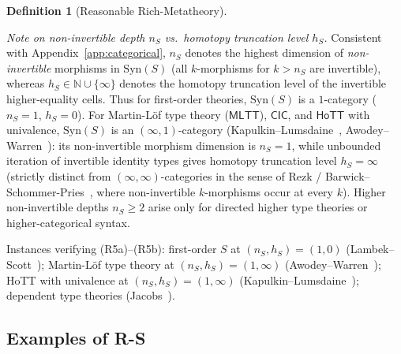 \documentclass[11pt]{article}
\theoremstyle{plain}
\theoremstyle{definition}
\newtheorem{definition}[theorem]{Definition}
\newcommand{\Syn}{\mathrm{Syn}}
\newcommand{\MLTT}{\mathsf{MLTT}}
\newcommand{\HoTT}{\mathsf{HoTT}}
\newcommand{\CIC}{\mathsf{CIC}}
\begin{document}
\begin{definition}[Reasonable Rich-Metatheory]
\begin{itemize}
\emph{Note on non-invertible depth $n_S$ vs.\ homotopy truncation level $h_S$.} Consistent with Appendix~\ref{app:categorical}, $n_S$ denotes the highest dimension of \emph{non-invertible} morphisms in $\Syn(S)$ (all $k$-morphisms for $k > n_S$ are invertible), whereas $h_S \in \mathbb{N} \cup \{\infty\}$ denotes the homotopy truncation level of the invertible higher-equality cells. Thus for first-order theories, $\Syn(S)$ is a $1$-category ($n_S = 1$, $h_S = 0$). For Martin-L\"of type theory ($\MLTT$), $\CIC$, and $\HoTT$ with univalence, $\Syn(S)$ is an $(\infty, 1)$-category (Kapulkin--Lumsdaine~\cite{KapulkinLumsdaine2021}, Awodey--Warren~\cite{AwodeyWarren2009}): its non-invertible morphism dimension is $n_S = 1$, while unbounded iteration of invertible identity types gives homotopy truncation level $h_S = \infty$ (strictly distinct from $(\infty, \infty)$-categories in the sense of Rezk / Barwick--Schommer-Pries~\cite{BarwickSchommerPries2021}, where non-invertible $k$-morphisms occur at every $k$). Higher non-invertible depths $n_S \ge 2$ arise only for directed higher type theories or higher-categorical syntax.

Instances verifying (R5a)--(R5b): first-order $S$ at $(n_S, h_S) = (1, 0)$ (Lambek--Scott~\cite{LambekScott1986}); Martin-L\"of type theory at $(n_S, h_S) = (1, \infty)$ (Awodey--Warren~\cite{AwodeyWarren2009}); HoTT with univalence at $(n_S, h_S) = (1, \infty)$ (Kapulkin--Lumsdaine~\cite{KapulkinLumsdaine2021}); dependent type theories (Jacobs~\cite{Jacobs1999}).
\end{itemize}
\end{definition}

\subsection{Examples of R-S}
\end{document}
